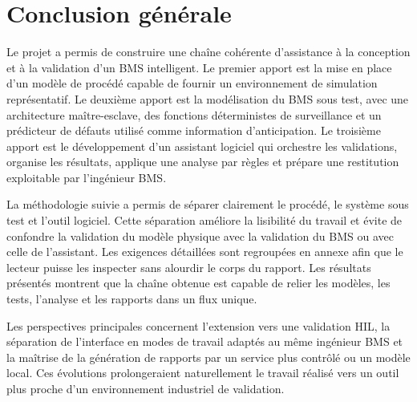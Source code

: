 \chapter*{Conclusion générale}

Le projet a permis de construire une chaîne cohérente d'assistance à la
conception et à la validation d'un BMS intelligent. Le premier apport est la
mise en place d'un modèle de procédé capable de fournir un environnement de
simulation représentatif. Le deuxième apport est la modélisation du BMS sous
test, avec une architecture maître-esclave, des fonctions déterministes de
surveillance et un prédicteur de défauts utilisé comme information
d'anticipation. Le troisième apport est le développement d'un assistant
logiciel qui orchestre les validations, organise les résultats, applique une
analyse par règles et prépare une restitution exploitable par l'ingénieur BMS.

La méthodologie suivie a permis de séparer clairement le procédé, le système
sous test et l'outil logiciel. Cette séparation améliore la lisibilité du
travail et évite de confondre la validation du modèle physique avec la
validation du BMS ou avec celle de l'assistant. Les exigences détaillées sont
regroupées en annexe afin que le lecteur puisse les inspecter sans alourdir le
corps du rapport. Les résultats présentés montrent que la chaîne obtenue est
capable de relier les modèles, les tests, l'analyse et les rapports dans un
flux unique.

Les perspectives principales concernent l'extension vers une validation HIL,
la séparation de l'interface en modes de travail adaptés au même ingénieur BMS
et la maîtrise de la génération de rapports par un service plus contrôlé ou un
modèle local. Ces évolutions prolongeraient naturellement le travail réalisé
vers un outil plus proche d'un environnement industriel de validation.

